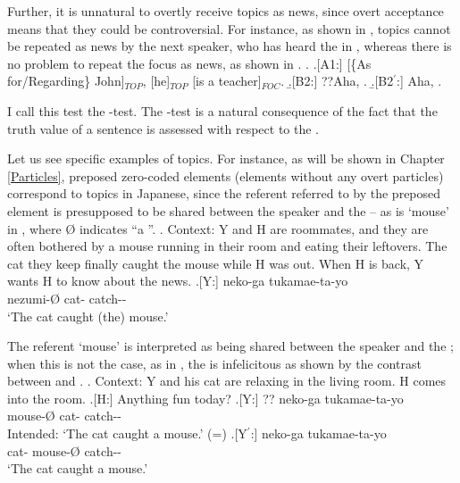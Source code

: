 Further, it is unnatural to overtly receive topics as news, since overt acceptance means that they could be controversial.
For instance, as shown in \Next[B2],
topics cannot be repeated as news by the next speaker, who has heard the  in \Next[A1],
whereas there is no problem to repeat the focus as news, as shown in \Next[B2$^{\prime}$].
%
\ex.\label{aha} \a.[A1:] [\{As for/Regarding\} John]$_{TOP}$, [he]$_{TOP}$ [is a teacher]$_{FOC}$.
     \b.[B2:] ??Aha, .
     \b.[B2$^{\prime}$:] Aha, .

I call this test the -test.
The -test is a natural consequence of the fact that
the truth value of a sentence is assessed with respect to the  \cite{strawson64}.

Let us see specific examples of topics.
For instance,
as will be shown in Chapter \ref{Particles},
preposed zero-coded elements (elements without any overt particles) correspond to topics in Japanese,
since the referent referred to by the preposed element is presupposed to be shared between the speaker and the  -- as is  `mouse' in \Next,
where {\O} indicates ``a ''.
	\ex. \label{FrameworkExMouse}Context: Y and H are roommates,
		and they are often bothered by a mouse running in their room
		and eating their leftovers.
		The cat they keep finally caught the mouse while H was out.
		When H is back, Y wants H to know about the news.
		\ag.[Y:]  neko-ga tukamae-ta-yo \\
			nezumi-{\O} cat- catch-- \\
			`The cat caught (the) mouse.'
	
The referent `mouse' is interpreted as being shared between the speaker and the ;
when this is not the case, as in \Next,
the  is infelicitous as shown by the contrast between \Next[Y] and \Next[Y$^{\prime}$].
	\ex. \label{TopDef}Context: Y and his cat are relaxing in the living room.
		H comes into the room.
		\a.[H:] Anything fun today?
		\bg.[Y:] ?? neko-ga tukamae-ta-yo \\
			mouse-{\O} cat- catch-- \\
			Intended: `The cat caught a mouse.' \hfill{(=\LLast[Y])}
		\bg.[Y$^{\prime}$:] neko-ga  tukamae-ta-yo \\
			cat- mouse-{\O} catch-- \\
			`The cat caught a mouse.'

